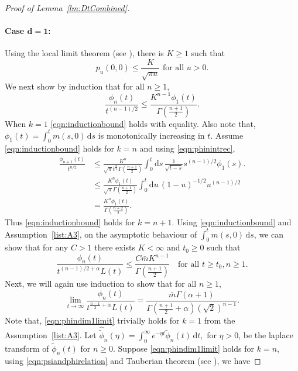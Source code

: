 \documentclass{article}[12pt]
\theoremstyle{definition}
\newcommand{\1}{\mathbbm{1}}
\newcommand{\dd }{\mathrm{d} }
\begin{document}
\begin{proof}[Proof of Lemma~\ref{lm:DtCombined}]
\paragraph{Case $\mathbf{d=1}$:} Using the local limit theorem (see \cite[Chapter~II.7, Proposition~9]{S1964}), there is $K\ge 1$ such that 
$$p_u(0,0)\le \frac{K}{\sqrt{\pi u}} \text{ for all } u > 0.$$
We next show by induction that for all $n\geq 1$,
\begin{equation}
    \frac{\phi_n(t)}{t^{(n-1)/2}}\le \frac{K^{n-1}\phi_1(t)}{\Gamma\left(\frac{n+1}{2}\right)}.
    \label{eqn:inductionbound}
\end{equation}
When $k=1$ \eqref{eqn:inductionbound} holds with equality. Also note that, $\phi_1(t) = \int_0^t m(s,0)\,\dd s$ is monotonically increasing in $t$. Assume \eqref{eqn:inductionbound} holds for $k=n$ and using \eqref{eqn:phinintrec}, 
\begin{align*}
    \frac{\phi_{n+1}(t)}{t^{n/2}} &\le \frac{K^n}{\sqrt{\pi}t^{\frac{n}{2}}\Gamma\left(\frac{n+1}{2}\right)}\int_0^t \dd s\, \frac{1}{\sqrt{t-s}}s^{(n-1)/2}\phi_1(s).\\
    &\le \frac{K^n \phi_1(t)}{\sqrt{\pi}\Gamma\left(\frac{n+1}{2}\right)}\int_0^t\dd u\, (1-u)^{-1/2}u^{(n-1)/2}\\
    &= \frac{K^n \phi_1(t)}{\Gamma\left(\frac{n+2}{2}\right)}.   \end{align*}
Thus \eqref{eqn:inductionbound} holds for $k = n+1$. Using \eqref{eqn:inductionbound} and Assumption~\ref{list:A3}, on the asymptotic behaviour of $\int_0^tm(s,0)\,\dd s$, we can show that for any $C>1$ there exists $K< \infty$ and $t_0\ge 0$ such that 
\begin{equation}
   \frac{\phi_n(t)}{t^{(n-1)/2 + \alpha}L(t)} \le \frac{C\bar{m}K^{n-1}}{\Gamma\left(\frac{n+1}{2}\right)} \quad\text{for all $t\ge t_0, n\ge 1$.}
    \label{eqn:psinbounded}
\end{equation}
Next, we will again use induction to show that  for all $n\geq 1$,
\begin{equation}
    \lim_{t\to \infty}\frac{\phi_n(t)}{t^{\frac{n-1}{2}+\alpha}L(t)} = \frac{\bar{m}\Gamma(\alpha + 1)}{\Gamma\left(\frac{n+1}{2}+\alpha\right)(\sqrt{2})^{n-1}}.
    \label{eqn:phindim1limit}
\end{equation}
Note that, \eqref{eqn:phindim1limit} trivially holds for $k=1$ from the Assumption~\ref{list:A3}. Let $\hat{\tilde{\phi}}_{n}(\eta)= \int_0^\infty e^{-\eta t} {\tilde{\phi}}_{n}(t)\,\dd t,$ for $\eta>0$, be the laplace transform of $\tilde{\phi}_n(t)$ for $n\ge 0$. Suppose \eqref{eqn:phindim1limit} holds for $k = n$, using \eqref{eqn:psiandphirelation} and Tauberian theorem (see \cite[Chapter~XIII.5, Theorem~2]{F1971}), we have

\end{proof}
\end{document}
